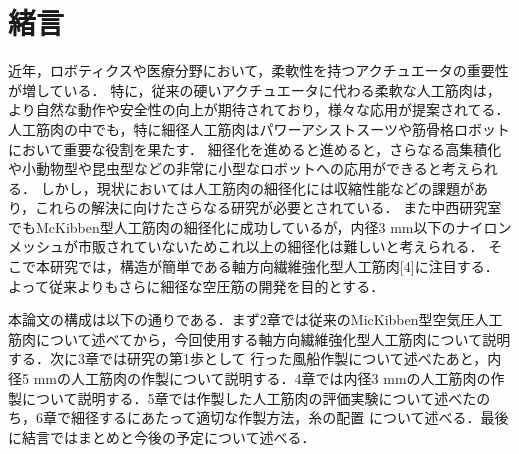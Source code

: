 \newpage
\setcounter{page}{1}
\section{緒言}
近年，ロボティクスや医療分野において，柔軟性を持つアクチュエータの重要性が増している\cite{Hauser}．
特に，従来の硬いアクチュエータに代わる柔軟な人工筋肉は，より自然な動作や安全性の向上が期待されており，様々な応用が提案されてる．
人工筋肉の中でも，特に細径人工筋肉はパワーアシストスーツや筋骨格ロボットにおいて重要な役割を果たす\cite{11}．
細径化を進めると進めると，さらなる高集積化や小動物型や昆虫型などの非常に小型なロボットへの応用ができると考えられる\cite{mi14071431}．
しかし，現状においては人工筋肉の細径化には収縮性能などの課題があり，これらの解決に向けたさらなる研究が必要とされている．
また中西研究室でもMcKibben型人工筋肉の細径化に成功しているが\cite{22}，内径3 mm以下のナイロンメッシュが市販されていないためこれ以上の細径化は難しいと考えられる．
そこで本研究では，構造が簡単である軸方向繊維強化型人工筋肉[4]に注目する．よって従来よりもさらに細径な空圧筋の開発を目的とする．

本論文の構成は以下の通りである．まず2章では従来のMicKibben型空気圧人工筋肉について述べてから，今回使用する軸方向繊維強化型人工筋肉について説明する．次に3章では研究の第1歩として
行った風船作製について述べたあと，内径5 mmの人工筋肉の作製について説明する．4章では内径3 mmの人工筋肉の作製について説明する．5章では作製した人工筋肉の評価実験について述べたのち，6章で細径するにあたって適切な作製方法，糸の配置
について述べる．最後に結言ではまとめと今後の予定について述べる．
